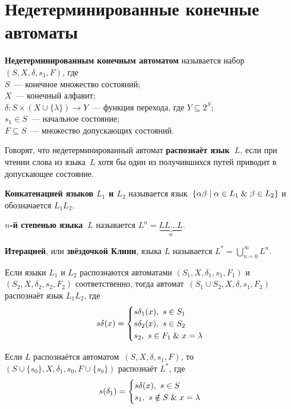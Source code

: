 \section{Недетерминированные конечные автоматы}
 \textbf{Недетерминированным конечным автоматом} называется набор~$(S, X, \delta, s_1, F)$, где\\
$S$~--- конечное множество состояний;\\
$X$~--- конечный алфавит;\\
$\delta \colon S \times (X \cup \{ \lambda \}) \to Y$~--- функция перехода, где $Y \subseteq 2^S$;\\
$s_1 \in S$~--- начальное состояние;\\
$F \subseteq S$~--- множество допускающих состояний.

Говорят, что недетерминированный автомат \textbf{распознаёт язык~$L$}, если при чтении слова из языка~$L$ хотя бы один из получившихся путей приводит в допускающее состояние.

 \textbf{Конкатенацией языков $L_1$ и $L_2$} называется язык~$\{ \alpha \beta \mid \alpha \in L_1 \mathrel{\&} \beta \in L_2 \}$ и обозначается $L_1 L_2$.

 \textbf{$n$-й степенью языка~$L$} называется $L^n = \underbrace{L L \ldots L}_n$.

  \textbf{Итерацией}, или \textbf{звёздочкой Клини}, языка $L$ называется $L^* = \bigcup\limits_{n=0}^\infty L^n$.

Если языки $L_1$ и $L_2$ распознаются автоматами $(S_1, X, \delta_1, s_1, F_1)$ и $(S_2, X, \delta_2, s_2, F_2)$ соответственно, тогда автомат~$(S_1 \cup S_2, X, \delta, s_1, F_2)$ распознаёт язык $L_1 L_2$, где
\begin{equation*}
s \delta(x) =
\begin{cases}
s \delta_1(x), \ s \in S_1 \\
s \delta_2(x), \ s \in S_2 \\
s_2, \ s \in F_1 \mathrel{\&} x = \lambda
\end{cases}
\end{equation*}

Если $L$ распознаётся автоматом~$(S, X, \delta, s_1, F)$, то $(S \cup \{ s_0 \}, X, \delta_1, s_0, F \cup \{ s_0 \})$ распознаёт $L^*$, где
\begin{equation*}
s(\delta_1) =
\begin{cases}
s \delta(x), \ s \in S \\
s_1, \ s \notin S \mathrel{\&} x = \lambda
\end{cases}
\end{equation*}